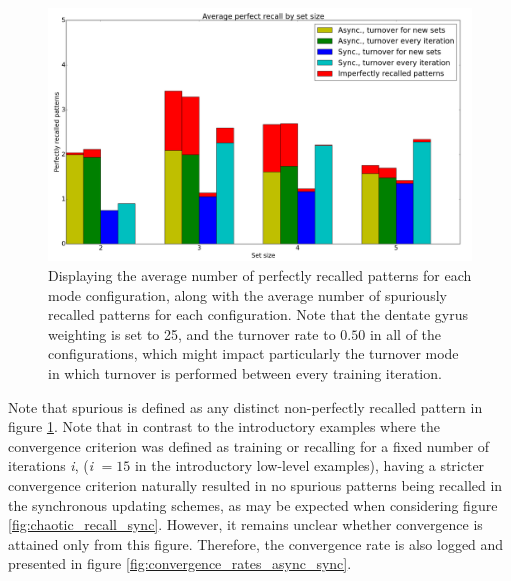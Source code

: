 \begin{figure}
    \centering
    \includegraphics[width=13cm]{fig/cut_prr_with_spurious_reset_every_experiment}
    \caption{Displaying the average number of perfectly recalled patterns for each mode configuration, along with the average number of spuriously recalled patterns for each configuration. Note that the dentate gyrus weighting is set to 25, and the turnover rate to $0.50$ in all of the configurations, which might impact particularly the turnover mode in which turnover is performed between every training iteration.}
    \label{fig:avg_perfect_recall_rates_with_spurious_bars}
\end{figure}

Note that spurious is defined as any distinct non-perfectly recalled pattern in figure \ref{fig:avg_perfect_recall_rates_with_spurious_bars}. Note that in contrast to the introductory examples where the convergence criterion was defined as training or recalling for a fixed number of iterations \textit{i}, (\textit{i} $=15$ in the introductory low-level examples), having a stricter convergence criterion naturally resulted in no spurious patterns being recalled in the synchronous updating schemes, as may be expected when considering figure \ref{fig:chaotic_recall_sync}. However, it remains unclear whether convergence is attained only from this figure. Therefore, the convergence rate is also logged and presented in figure \ref{fig:convergence_rates_async_sync}.

